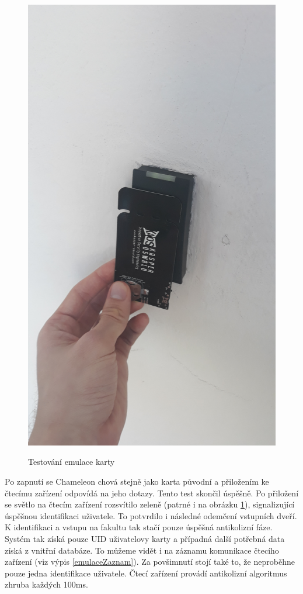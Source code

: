 \begin{figure}[ht]\centering
  \centering
  \includegraphics[width=\linewidth, angle=270]{obrazky-figures/obrazekPokusEmulace.jpg}\\[1pt]  
  \caption{Testování emulace karty}    
  \label{obrazekPokusEmulace}
\end{figure}
Po zapnutí se Chameleon chová stejně jako karta původní a přiložením ke čtecímu zařízení odpovídá na jeho dotazy. Tento test skončil úspěšně. Po přiložení se světlo na čtecím zařízení rozsvítilo zeleně (patrné i na obrázku \ref{obrazekPokusEmulace}), signalizující úspěšnou identifikaci uživatele. To potvrdilo i následné odemčení vstupních dveří. K identifikaci a vstupu na fakultu tak stačí pouze úspěšná antikolizní fáze. Systém tak získá pouze UID uživatelovy karty a případná další potřebná data získá z vnitřní databáze. To můžeme vidět i na záznamu komunikace čtecího zařízení (viz výpis \ref{emulaceZaznam}).  Za povšimnutí stojí také to, že neproběhne pouze jedna identifikace uživatele. Čtecí zařízení provádí antikolizní algoritmus zhruba každých 100ms. 
\par

